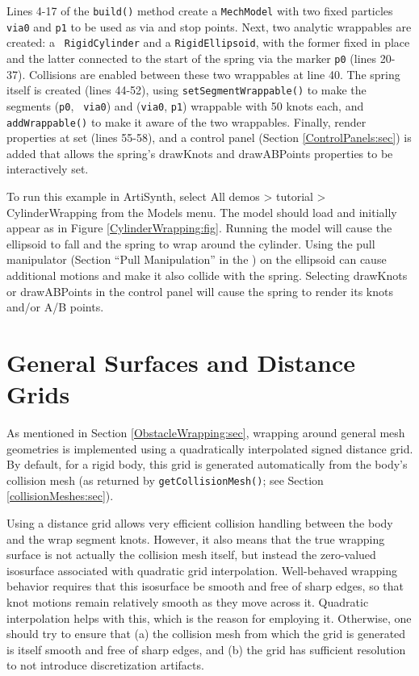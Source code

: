 Lines 4-17 of the {\tt build()} method create a {\tt MechModel} with
two fixed particles {\tt via0} and {\tt p1} to be used as via and stop
points. Next, two analytic wrappables are created: a {\tt
RigidCylinder} and a {\tt RigidEllipsoid}, with the former fixed in
place and the latter connected to the start of the spring via the
marker {\tt p0} (lines 20-37). Collisions are enabled between these
two wrappables at line 40. The spring itself is created (lines 44-52),
using {\tt setSegmentWrappable()} to make the segments ({\tt p0}, {\tt
via0}) and ({\tt via0}, {\tt p1}) wrappable with 50 knots each, and
{\tt addWrappable()} to make it aware of the two wrappables.  Finally,
render properties at set (lines 55-58), and a control panel (Section
\ref{ControlPanels:sec}) is added that allows the spring's {\sf
drawKnots} and {\sf drawABPoints} properties to be interactively set.

To run this example in ArtiSynth, select {\sf All demos > tutorial >
CylinderWrapping} from the {\sf Models} menu. The model should load and
initially appear as in Figure \ref{CylinderWrapping:fig}.  Running the
model will cause the ellipsoid to fall and the spring to wrap around
the cylinder. Using the pull manipulator
(Section ``Pull Manipulation'' in the
)
on the ellipsoid can cause additional motions and make it also collide
with the spring. Selecting {\sf drawKnots} or {\sf drawABPoints} in
the control panel will cause the spring to render its knots and/or A/B
points.

\section{General Surfaces and Distance Grids}
\label{GeneralSurfaceWrapping:sec}

As mentioned in Section \ref{ObstacleWrapping:sec}, wrapping around
general mesh geometries is implemented using a quadratically
interpolated signed distance grid. By default, for a rigid body, this
grid is generated automatically from the body's collision mesh (as
returned by {\tt getCollisionMesh()}; see Section
\ref{collisionMeshes:sec}).

Using a distance grid allows very efficient collision handling between
the body and the wrap segment knots. However, it also means that the
true wrapping surface is not actually the collision mesh itself, but
instead the zero-valued isosurface associated with quadratic grid
interpolation.  Well-behaved wrapping behavior requires that this
isosurface be smooth and free of sharp edges, so that knot motions
remain relatively smooth as they move across it. Quadratic
interpolation helps with this, which is the reason for employing
it. Otherwise, one should try to ensure that (a) the collision mesh
from which the grid is generated is itself smooth and free of sharp
edges, and (b) the grid has sufficient resolution to not introduce
discretization artifacts.

